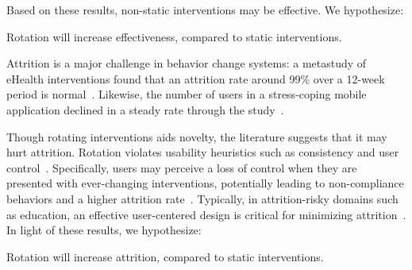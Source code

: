Based on these results, non-static interventions may be effective. We hypothesize:

\begin{hyp} \label{hyp:rotation}
Rotation will increase effectiveness, compared to static interventions.
\end{hyp}



Attrition is a major challenge in behavior change systems: a metastudy of eHealth interventions found that an attrition rate around 99\% over a 12-week period is normal~\cite{eysenbach2005law}. %
Likewise, the number of users in a stress-coping mobile application declined in a steady rate through the study~\cite{paredes2014poptherapy}. 

Though rotating interventions aids novelty, the literature suggests that it may hurt attrition. Rotation violates usability heuristics such as consistency and user control~\cite{nielsen199510}. Specifically, users may perceive a loss of control when they are presented with ever-changing interventions, %
potentially leading to non-compliance behaviors and a higher attrition
rate~\cite{coco2018hiniker}. %
Typically, in attrition-risky domains such as education, an effective user-centered design is critical for minimizing attrition~\cite{Angelino2007learning}. In light of these results, we hypothesize:

\begin{hyp} \label{hyp:attrition}
Rotation will increase attrition, compared to static interventions.
\end{hyp}




